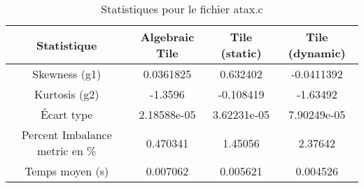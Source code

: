 \documentclass{article}
\begin{document}
\begin{table}[htbp]
  \centering
  \caption{Statistiques pour le fichier atax.c}
  \begin{tabular}{|c|c|c|c|}
    \hline
    Statistique & Algebraic Tile & Tile (static) & Tile (dynamic) \\ 
    \hline
    Skewness (g1) & 0.0361825 & 0.632402 & -0.0411392 \\ 
    Kurtosis (g2) & -1.3596 & -0.108419 & -1.63492 \\ 
    Écart type & 2.18588e-05 & 3.62231e-05 & 7.90249e-05\\ 
    Percent Imbalance metric en \% & 0.470341 & 1.45056 & 2.37642\\ 
    Temps moyen (s) & 0.007062 & 0.005621 & 0.004526 \\ 
    \hline
  \end{tabular}
\end{table}
\newpage
\end{document}
